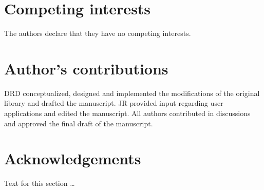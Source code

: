 \documentclass[twocolumn]{bmcart}
\begin{document}
\begin{backmatter}

\section*{Competing interests}

The authors declare that they have no competing interests.



\section*{Author's contributions}

DRD conceptualized, designed and implemented the modifications of the original
library and drafted the manuscript. JR provided input regarding user
applications and edited the manuscript. All authors contributed in discussions
and approved the final draft of the manuscript.



\section*{Acknowledgements}
  Text for this section \ldots






\end{backmatter}
\end{document}
